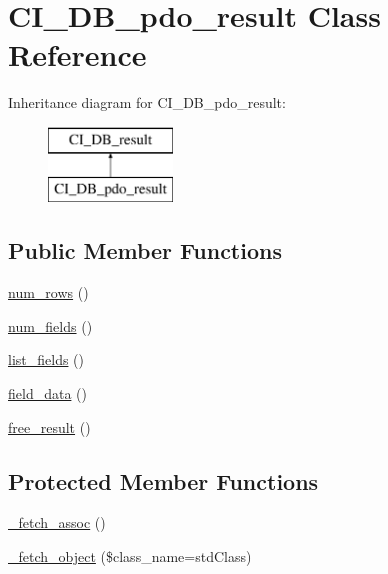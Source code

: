 \hypertarget{class_c_i___d_b__pdo__result}{}\section{C\+I\+\_\+\+D\+B\+\_\+pdo\+\_\+result Class Reference}
\label{class_c_i___d_b__pdo__result}
Inheritance diagram for C\+I\+\_\+\+D\+B\+\_\+pdo\+\_\+result\+:\begin{figure}[H]
\begin{center}
\leavevmode
\includegraphics[height=2.000000cm]{class_c_i___d_b__pdo__result}
\end{center}
\end{figure}
\subsection*{Public Member Functions}
\begin{DoxyCompactItemize}
\item 
\mbox{\hyperlink{class_c_i___d_b__pdo__result_ae49e35d86377eee23854b845a79a4ee8}{num\+\_\+rows}} ()
\item 
\mbox{\hyperlink{class_c_i___d_b__pdo__result_afff047ff4b88aa1db2e31e9d2d60664d}{num\+\_\+fields}} ()
\item 
\mbox{\hyperlink{class_c_i___d_b__pdo__result_af29d372702b1ed462d347290f6915c5a}{list\+\_\+fields}} ()
\item 
\mbox{\hyperlink{class_c_i___d_b__pdo__result_a03bb33642803f7f2d37ee4cd80ea55b9}{field\+\_\+data}} ()
\item 
\mbox{\hyperlink{class_c_i___d_b__pdo__result_a6f4c555dade73a89619a2718bf9c4f38}{free\+\_\+result}} ()
\end{DoxyCompactItemize}
\subsection*{Protected Member Functions}
\begin{DoxyCompactItemize}
\item 
\mbox{\hyperlink{class_c_i___d_b__pdo__result_ae6e6cb4b7084bc144c2e432de0d03f86}{\+\_\+fetch\+\_\+assoc}} ()
\item 
\mbox{\hyperlink{class_c_i___d_b__pdo__result_a34d33812f108a8fefb7cff433608de28}{\+\_\+fetch\+\_\+object}} (\$class\+\_\+name=\textquotesingle{}std\+Class\textquotesingle{})
\end{DoxyCompactItemize}
